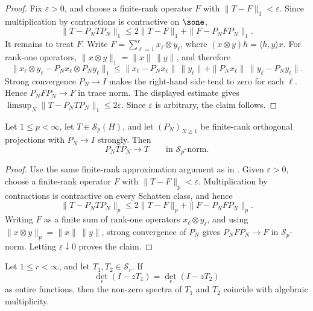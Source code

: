 \begin{proof}
  Fix \(\varepsilon>0\), and choose a finite-rank operator \(F\) with
  \(\|T-F\|_1<\varepsilon\). Since multiplication by contractions is
  contractive on \(\sone\),
  \[
    \|T-P_NTP_N\|_1
    \le 2\|T-F\|_1+\|F-P_NFP_N\|_1.
  \]
  It remains to treat \(F\). Write \(F=\sum_{\ell=1}^r x_\ell\otimes
  y_\ell\), where \((x\otimes y)h=\langle h,y\rangle x\). For rank-one
  operators, \(\|x\otimes y\|_1=\|x\|\,\|y\|\), and therefore
  \[
    \|x_\ell\otimes y_\ell-P_Nx_\ell\otimes P_Ny_\ell\|_1
    \le \|x_\ell-P_Nx_\ell\|\,\|y_\ell\|
      +\|P_Nx_\ell\|\,\|y_\ell-P_Ny_\ell\|.
  \]
  Strong convergence \(P_N\to I\) makes the right-hand side tend to zero
  for each \(\ell\). Hence \(P_NFP_N\to F\) in trace norm.  The displayed
  estimate gives \(\limsup_N\|T-P_NTP_N\|_1\le 2\varepsilon\). Since
  \(\varepsilon\) is arbitrary, the claim follows.
\end{proof}

\begin{lemma}
  \label{lem:schatten-schur-compressions}
  Let \(1\le p<\infty\), let \(T\in\mathcal S_p(H)\), and let
  \((P_N)_{N\ge1}\) be finite-rank orthogonal projections with
  \(P_N\to I\) strongly. Then
  \[
    P_NTP_N\longrightarrow T
    \qquad\text{in }\mathcal S_p\text{-norm}.
  \]
\end{lemma}

\begin{proof}
  Use the same finite-rank approximation argument as in
  . Given \(\varepsilon>0\),
  choose a finite-rank operator \(F\) with \(\|T-F\|_p<\varepsilon\).
  Multiplication by contractions is contractive on every Schatten class,
  and hence
  \[
    \|T-P_NTP_N\|_p
    \le 2\|T-F\|_p+\|F-P_NFP_N\|_p.
  \]
  Writing \(F\) as a finite sum of rank-one operators
  \(x_\ell\otimes y_\ell\), and using
  \(\|x\otimes y\|_p=\|x\|\,\|y\|\), strong convergence of \(P_N\) gives
  \(P_NFP_N\to F\) in \(\mathcal S_p\)-norm. Letting
  \(\varepsilon\downarrow0\) proves the claim.
\end{proof}

\begin{lemma}
  \label{lem:regularized-determinant-spectral-rigidity}
  Let \(1\le r<\infty\), and let \(T_1,T_2\in\mathcal S_r\). If
  \[
    \det_r(I-zT_1)=\det_r(I-zT_2)
  \]
  as entire functions, then the non-zero spectra of \(T_1\) and \(T_2\)
  coincide with algebraic multiplicity.
\end{lemma}

